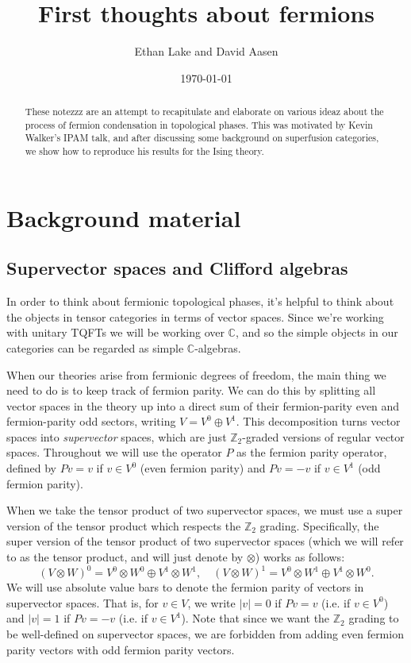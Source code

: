 \documentclass[12pt,a4paper]{article}
\newcommand{\tp}{\otimes}
\newcommand{\cc}{\mathbb{C}}
\newcommand{\zt}{\mathbb{Z}_2}
\newcommand\be            {\begin{equation}}
\newcommand\ee            {\end{equation}}
\begin{document}
\title{First thoughts about fermions}
\author{Ethan Lake and David Aasen}

\date{\today}

\maketitle


\begin{abstract}
These notezzz are an attempt to recapitulate and elaborate on various ideaz about the process of fermion condensation in topological phases. This was motivated by Kevin Walker's IPAM talk, and after discussing some background on superfusion categories, we show how to reproduce his results for the Ising theory.
\end{abstract}

\section{Background material} 

\subsection{Supervector spaces and Clifford algebras}
 
In order to think about fermionic topological phases, it's helpful to think about the objects in tensor 
categories in terms of vector spaces. Since we're working with unitary TQFTs we will be working over $\cc$, and so the simple objects in our categories can be regarded as simple $\cc$-algebras. 

When our theories arise from fermionic degrees of freedom, the main thing we need to do is to keep track of fermion parity. We can do this by splitting all vector spaces in the theory up into a direct sum of their fermion-parity even and fermion-parity odd sectors, writing $V = V^0 \oplus V^1$. This decomposition turns vector spaces into {\it supervector} spaces, which are just $\zt$-graded versions of regular vector spaces. Throughout we will use the operator $P$ as the fermion parity operator, defined by $Pv = v$ if $v\in V^0$ (even fermion parity) and $Pv = -v $ if $v\in V^1$ (odd fermion parity). 

When we take the tensor product of two supervector spaces, we must use a super version of the tensor product which respects the $\zt$ grading. Specifically, the super version of the tensor product of two supervector spaces (which we will refer to as the tensor product, and will just denote by $\tp$) works as follows:
\be (V\tp W)^0 = V^0 \tp W^0 \oplus V^1 \tp W^1,\quad (V\tp W)^1 = V^0 \tp W^1 \oplus V^1 \tp W^0.\ee
We will use absolute value bars to denote the fermion parity of vectors in supervector spaces. That is, for $v\in V$, we write $|v| = 0$ if $Pv = v$ (i.e. if $v\in V^0$) and $|v| = 1$ if $Pv = -v$ (i.e. if $v\in V^1$). Note that since we want the $\zt$ grading to be well-defined on supervector spaces, we are forbidden from adding even fermion parity vectors with odd fermion parity vectors. 
\end{document}
